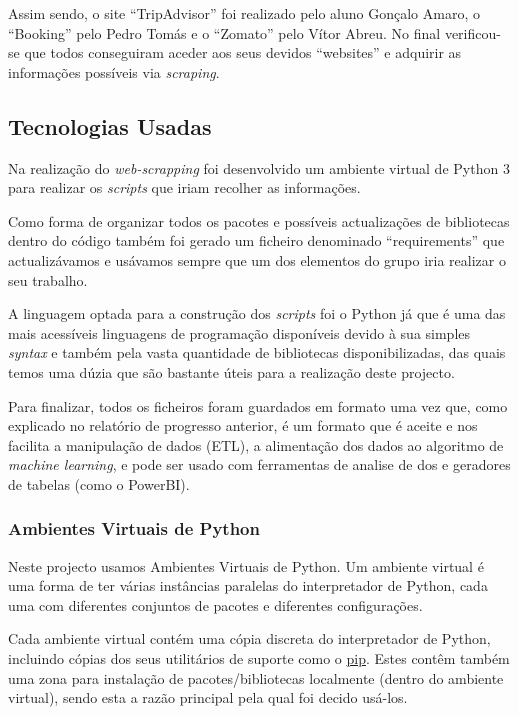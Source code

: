 \documentclass[a4paper,10pt]{article}
\begin{document}
Assim sendo, o site ``TripAdvisor'' foi realizado pelo aluno Gonçalo Amaro, o ``Booking'' pelo Pedro Tomás e o ``Zomato'' pelo Vítor Abreu. No final verificou-se que todos conseguiram aceder aos seus devidos ``websites'' e adquirir as informações possíveis via \textit{scraping}.

\subsection{Tecnologias Usadas}

Na realização do \textit{web-scrapping} foi desenvolvido um ambiente virtual de Python 3 para realizar os \textit{scripts} que iriam recolher as informações.

Como forma de organizar todos os pacotes e possíveis actualizações de bibliotecas dentro do código também foi gerado um ficheiro  denominado ``requirements'' que actualizávamos e usávamos sempre que um dos elementos do grupo iria realizar o seu trabalho.

A linguagem optada para a construção dos \textit{scripts} foi o Python já que é uma das mais acessíveis linguagens de programação disponíveis devido à sua simples \textit{syntax} e também pela vasta quantidade de bibliotecas disponibilizadas, das quais temos uma dúzia que são bastante úteis para a realização deste projecto.

Para finalizar, todos os ficheiros foram guardados em formato  uma vez que, como explicado no relatório de progresso anterior, é um formato que é aceite e nos facilita a manipulação de dados (ETL), a alimentação dos dados ao algoritmo de \textit{machine learning}, e pode ser usado com ferramentas de analise de dos e geradores de tabelas (como o PowerBI).

\subsubsection{Ambientes Virtuais de Python}

Neste projecto usamos Ambientes Virtuais de Python. Um ambiente virtual é uma forma de ter várias instâncias paralelas do interpretador de Python, cada uma com diferentes conjuntos de pacotes e diferentes configurações.

Cada ambiente virtual contém uma cópia discreta do interpretador de Python, incluindo cópias dos seus utilitários de suporte como o \href{https://pypi.org/project/pip/}{pip}. Estes contêm também uma zona para instalação de pacotes/bibliotecas localmente (dentro do ambiente virtual), sendo esta a razão principal pela qual foi decido usá-los.
\end{document}
